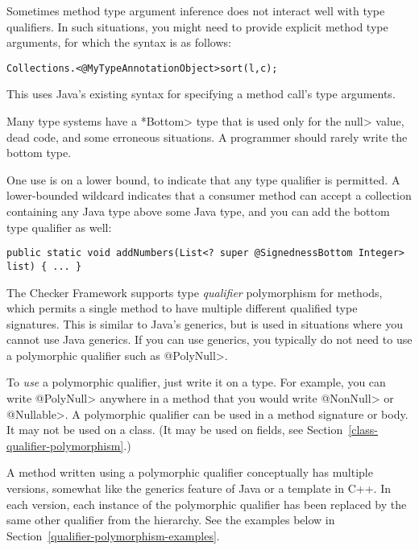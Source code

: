 
Sometimes method type argument inference does not interact well with
type qualifiers. In such situations, you might need to provide
explicit method type arguments, for which the syntax is as follows:

\begin{alltt}
    Collections.<@MyTypeAnnotation Object>sort(l, c);
\end{alltt}

\noindent
This uses Java's existing syntax for specifying a method call's type arguments.



Many type systems have a \<*Bottom> type that is used only for the \<null>
value, dead code, and some erroneous situations.  A programmer should
rarely write the bottom type.

One use is on a lower bound, to indicate that any type qualifier is
permitted.  A lower-bounded wildcard indicates that a consumer method can
accept a collection containing any Java type above some Java type, and you
can add the bottom type qualifier as well:

\begin{Verbatim}
public static void addNumbers(List<? super @SignednessBottom Integer> list) { ... }
\end{Verbatim}



The Checker Framework supports type \emph{qualifier} polymorphism for
methods, which permits a single method to have multiple different qualified
type signatures.  This is similar to Java's generics, but is used in
situations where you cannot use Java generics.  If you can use generics,
you typically do not need to use a polymorphic qualifier such as \<@PolyNull>.

To \emph{use} a polymorphic qualifier, just write it on a type.
For example, you can write \<@PolyNull> anywhere in a method that you would write
\<@NonNull> or \<@Nullable>.
A polymorphic qualifier can be used in a method signature or body.
It may not be used on a class. (It may be used on fields, see Section~\ref{class-qualifier-polymorphism}.)

A method written using a polymorphic qualifier conceptually has multiple
versions, somewhat like the generics feature of Java or a template in C++.
In each version, each instance of the polymorphic qualifier has been
replaced by the same other qualifier from the hierarchy.  See the examples
below in Section~\ref{qualifier-polymorphism-examples}.

